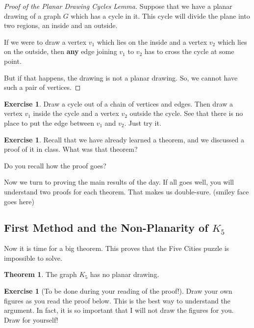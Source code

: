 \documentclass[12pt,letterpaper]{article}
\theoremstyle{definition}
\newtheorem{exercise}[question]{Exercise}
\newtheorem{theorem}{Theorem}
\begin{document}
\begin{proof}[Proof of the Planar Drawing Cycles Lemma]
Suppose that we have a planar drawing of a graph $G$ which has a cycle in it. This cycle will divide the plane into two regions, an inside and an outside.  

If we were to draw a vertex $v_1$ which lies on the inside and a vertex $v_2$ which lies on the outside, then 
\textbf{any} edge joining $v_1$ to $v_2$ has to cross the cycle at some point. 

But if that happens, the drawing is not a planar drawing. So, we cannot have such a pair of vertices.
\end{proof}

\begin{exercise}
Draw a cycle out of a chain of vertices and edges. Then draw a vertex $v_1$ inside the cycle and a vertex $v_2$ outside the cycle.  See that there is no place to put the edge between $v_1$ and $v_2$. Just try it.
\end{exercise}

\begin{exercise}
Recall that we have already learned a theorem, and we discussed a proof of it in class. What was that theorem?

Do you recall how the proof goes?
\end{exercise}


Now we turn to proving the main results of the day. If all goes well, you will understand two proofs for each theorem. That makes us double-sure. (smiley face goes here)

\clearpage

\subsection*{First Method and the Non-Planarity of $K_5$}

Now it is time for a big theorem. This proves that the Five Cities puzzle is impossible to solve.

\begin{theorem}\label{thm:k5}
The graph $K_5$ has no planar drawing.
\end{theorem}

\begin{exercise}[To be done during your reading of the proof!]
Draw your own figures as you read the proof below. This is the best way to understand the argument.
In fact, it is so important that I will not draw the figures for you. Draw for yourself!
\end{exercise}
\end{document}
